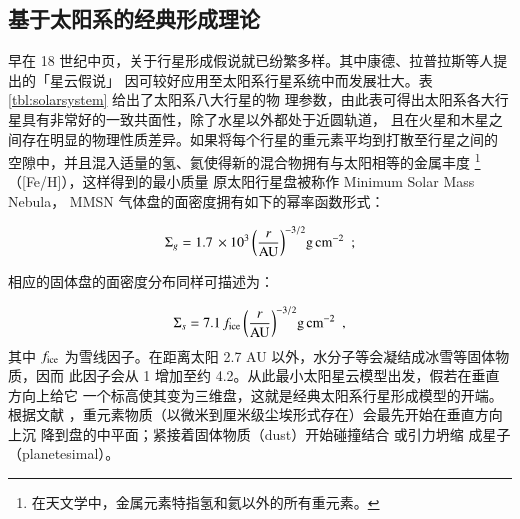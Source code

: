 \subsection{基于太阳系的经典形成理论} \label{sec:clspftheory}

早在 18 世纪中页，关于行星形成假说就已纷繁多样。其中康德、拉普拉斯等人提出的「星云假说」
因可较好应用至太阳系行星系统中而发展壮大。表\ref{tbl:solarsystem} 给出了太阳系八大行星的物
理参数，由此表可得出太阳系各大行星具有非常好的一致共面性，除了水星以外都处于近圆轨道，
且在火星和木星之间存在明显的物理性质差异。如果将每个行星的重元素平均到打散至行星之间的
空隙中，并且混入适量的氢、氦使得新的混合物拥有与太阳相等的金属丰度
\footnote{在天文学中，金属元素特指氢和氦以外的所有重元素。}（[Fe/H]），这样得到的最小质量
原太阳行星盘被称作 Minimum Solar Mass Nebula\cite{Weidenschilling1977,Hayashi1981}，
MMSN 气体盘的面密度拥有如下的幂率函数形式：

\begin{equation} \label{eq:mmsng}
\Sigma_g = 1.7 \,\times10^3 \, \bigg(\frac{r}{\tif{AU}}\bigg)^{-3/2}  \tif{g} \,\tif{cm}^{-2} \ \ ; 
\end{equation} 

相应的固体盘的面密度分布同样可描述为：

\begin{equation} \label{eq:mmsns}
\Sigma_s = 7.1 \, f_\tif{ice} \, \bigg(\frac{r}{\tif{AU}}\bigg)^{-3/2}  \tif{g} \,\tif{cm}^{-2} \ \ ,
\end{equation} 
其中 $f_\mathrm{ice}$ 为雪线因子。在距离太阳 2.7 AU 以外，水分子等会凝结成冰雪等固体物质，因而
此因子会从 1 增加至约 4.2\cite{IdaLin2004}。从此最小太阳星云模型出发，假若在垂直方向上给它
一个标高使其变为三维盘，这就是经典太阳系行星形成模型的开端。根据文献 
，重元素物质（以微米到厘米级尘埃形式存在）会最先开始在垂直方向上沉
降到盘的中平面；紧接着固体物质（dust）开始碰撞结合
\cite{ppvibook2014,Weidenschilling1997,BlumWurm2008}或引力坍缩
\cite{Safronov1972,GoldreichWard1973,YoudinShu2002,ChiangYoudin2010}成星子（planetesimal）。

